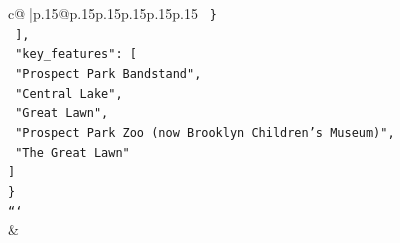 \documentclass{article}
\begin{document}
{\begin{supertabular}{c@{$\;$}|p{.15\linewidth}@{}p{.15\linewidth}p{.15\linewidth}p{.15\linewidth}p{.15\linewidth}p{.15\linewidth}}
{{{\texttt{    \}} \\
\texttt{  {]},} \\
\texttt{  "key\_features": {[}} \\
\texttt{    "Prospect Park Bandstand",} \\
\texttt{    "Central Lake",} \\
\texttt{    "Great Lawn",} \\
\texttt{    "Prospect Park Zoo (now Brooklyn Children's Museum)",} \\
\texttt{    "The Great Lawn"} \\
\texttt{  {]}} \\
\texttt{\}} \\
\texttt{```} \\
            }
        }
    }
    & \\ \\


\end{supertabular}}
\end{document}
